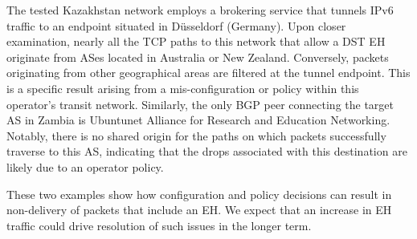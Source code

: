 \documentclass[conference]{IEEEtran}
\begin{document}

The tested Kazakhstan network employs a brokering service that tunnels IPv6 traffic to an endpoint situated in Düsseldorf (Germany). Upon closer examination,  nearly all the TCP paths to this network that allow a DST EH originate from ASes
located in Australia or New Zealand. Conversely, packets originating from other
geographical areas are filtered at the tunnel endpoint. This is a specific
result arising from a mis-configuration or policy within this operator's
transit network.
Similarly, the only BGP peer connecting the target AS in Zambia is Ubuntunet
Alliance for Research and Education Networking.  Notably, there is no shared
origin for the paths on which packets successfully traverse to this AS,
indicating that the drops associated with this destination are likely
due to an operator policy. 

These two examples show how configuration and policy 
decisions can result in non-delivery of packets that include an EH. We expect 
that an increase in EH traffic could drive resolution of such issues in the longer term.
\end{document}
